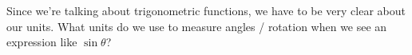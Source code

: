 \documentclass{ximera}
\begin{document}
\begin{problem}
   Since we're talking about trigonometric functions, we have to be very clear about our units.  What units do we use to measure angles / rotation when we see an expression like $\sin \theta$?
    \begin{multipleChoice}
     \end{multipleChoice}
\end{problem}



%
\end{document}

